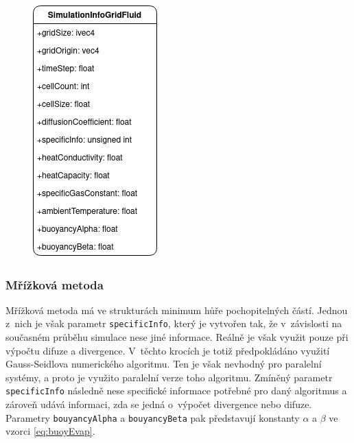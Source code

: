 \begin{figure}[hbt]
	\centering
	\captionsetup{justification=centering}
	\includegraphics[scale=0.6]{obrazky-figures/SimulationInfoGridFluid.png}
	\label{fig:structsGrid}
\end{figure}

\subsubsection{Mřížková metoda}
Mřížková metoda má ve strukturách minimum hůře pochopitelných částí. Jednou z~nich je však parametr \texttt{specificInfo}, který je vytvořen tak, že v~závislosti na současném průběhu simulace nese jiné informace. Reálně je však využit pouze při výpočtu difuze a divergence. V~těchto krocích je totiž předpokládáno využití Gauss-Seidlova numerického algoritmu. Ten je však nevhodný pro paralelní systémy, a proto je využito paralelní verze toho algoritmu. Zmíněný parametr \texttt{specificInfo} následně nese specifické informace potřebné pro daný algoritmus a zároveň udává informaci, zda se jedná o~výpočet divergence nebo difuze. Parametry \texttt{bouyancyAlpha} a \texttt{bouyancyBeta} pak představují konstanty $\alpha$ a $\beta$ ve vzorci \ref{eq:buoyEvap}.

